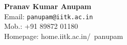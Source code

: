 \documentclass[12pt,a4paper]{article}
\begin{document}
{\LARGE\bf{Pranav Kumar Anupam}}\\
Email: \texttt{\large panupam@iitk.ac.in}\\
	Mob.: +91 89872 01180\\
Homepage: home.iitk.ac.in/~panupam\\

\hline 
\end{document}
